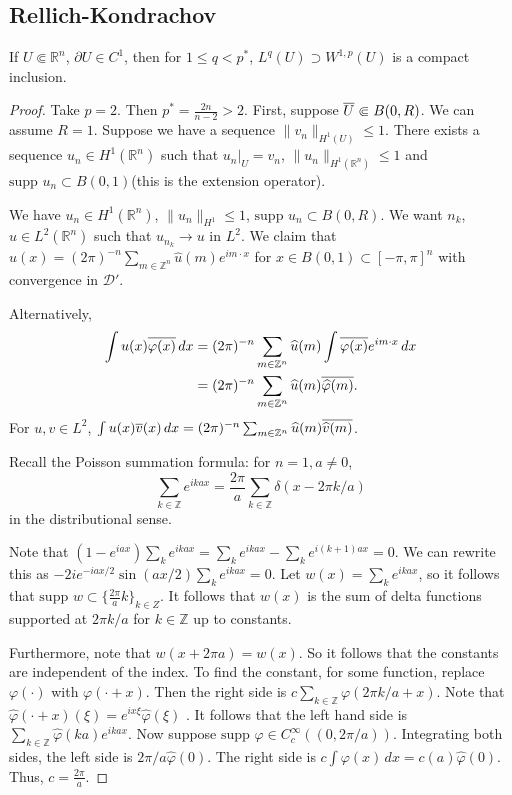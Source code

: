 \documentclass[12pt]{scrartcl}
\newcommand{\Z}{\mathbb{Z}}
\newcommand{\R}{\mathbb{R}}
\renewcommand{\hat}{\widehat}
\newcommand{\<}{\langle}
\renewcommand{\>}{\rangle}
\let \phi \varphi
\let \mc \mathcal
\newcommand{\supp}{\text{supp }}
\begin{document}
\subsection{Rellich-Kondrachov}
\begin{thm} If $U \Subset \R^n$, $\partial U \in C^1$, then for $1 \le q < p^*$, $L^q(U) \supset W^{1, p}(U)$ is a compact inclusion.
\end{thm}
\begin{proof}
Take $p = 2$.  Then $p^* = \frac{2n}{n-2} > 2$.  First, suppose $\overline{U} \Subset B(0, R)$.  We can assume $R = 1$.  Suppose we have a sequence $\|v_n\|_{H^1(U)} \le 1$.  There exists a sequence $u_n \in H^1(\R^n)$ such that $u_n\vert_U = v_n$, $\|u_n\|_{H^1(\R^n)} \le 1$ and $\supp u_n \subset B(0, 1)$(this is the extension operator).

We have $u_n \in H^1(\R^n)$, $\|u_n\|_{H^1} \le 1$, $\supp u_n \subset B(0, R)$.  We want $n_k$, $u \in L^2(\R^n)$ such that $u_{n_k} \to u$ in $L^2$.  We claim that $u(x) = (2\pi)^{-n} \sum_{m \in \Z^n} \hat{u}(m) e^{im\cdot x}$ for $x\in B(0, 1) \subset [-\pi, \pi]^n$ with convergence in $\mc D'$.

Alternatively,
\begin{align*}
\int u(x) \ol{\phi(x)}\,dx &= (2\pi)^{-n}\sum_{m \in \Z^n} \hat{u}(m) \int \ol{\phi(x)} e^{im\cdot x}\,dx\\
&= (2\pi)^{-n} \sum_{m \in \Z^n} \hat{u}(m) \ol{\hat{\phi}(m)}.
\end{align*}
For $u, v\in L^2$, $\int u(x)\ol{v}(x)\,dx = (2\pi)^{-n} \sum_{m \in \Z^n} \hat{u}(m) \ol{\hat{v}(m)}$.

Recall the Poisson summation formula: for $n = 1, a \ne 0$, $$\sum_{k \in \Z} e^{ikax} = \frac{2\pi}{a}\sum_{k \in \Z} \delta(x - 2\pi k/a)$$
in the distributional sense.

Note that $(1 - e^{iax}) \sum_k e^{ikax} = \sum_{k} e^{ikax} - \sum_{k} e^{i(k+1) ax} = 0$.  We can rewrite this as $-2ie^{-iax/2} \sin{(ax/2)} \sum_k e^{ikax} = 0$.  Let $w(x) = \sum_{k} e^{ikax}$, so it follows that $\supp w \subset \{\frac{2\pi}{a}k\}_{k \in Z}$.  It follows that $w(x)$ is the sum of delta functions supported at $2\pi k/a$ for $k \in \Z$ up to constants.  

Furthermore, note that $w(x + 2\pi a) = w(x)$.  So it follows that the constants are independent of the index.  To find the constant, for some function, replace $\phi(\cdot)$ with $\phi(\cdot + x)$.  Then the right side is $c \sum_{k \in \Z} \phi(2\pi k/a + x)$.  Note that $\hat{\phi}(\cdot + x)(\xi) = e^{ix \xi} \hat{\phi}(\xi)$ .  It follows that the left hand side is $\sum_{k \in \Z} \hat{\phi}(ka) e^{ikax}$.  Now suppose $\supp \phi \in C_c^\infty((0, 2\pi/a))$.    Integrating both sides, the left side is $2\pi/a \hat{\phi}(0)$.  The right side is $c \int \phi(x)\,dx = c(a) \hat{\phi}(0)$.  Thus, $c = \frac{2\pi}{a}$.


\end{proof}
\end{document}
